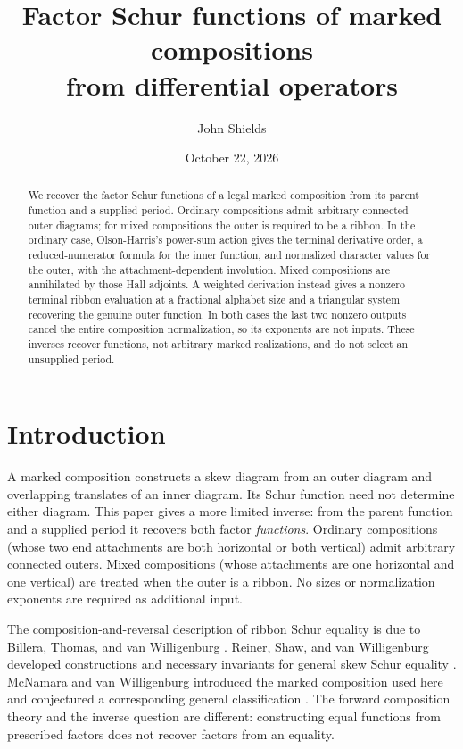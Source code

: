 \documentclass[11pt,a4paper]{amsart}
\title[Factor Schur functions from differential operators]{Factor Schur functions of marked compositions\\ from differential operators}
\author{John Shields}
\date{October 22, 2026}
\numberwithin{equation}{section}
\theoremstyle{plain}
\theoremstyle{definition}
\begin{document}
\begin{abstract}
We recover the factor Schur functions of a legal marked composition from its parent function and a supplied period.  Ordinary compositions admit arbitrary connected outer diagrams; for mixed compositions the outer is required to be a ribbon.  In the ordinary case, Olson-Harris's power-sum action gives the terminal derivative order, a reduced-numerator formula for the inner function, and normalized character values for the outer, with the attachment-dependent involution.  Mixed compositions are annihilated by those Hall adjoints.  A weighted derivation instead gives a nonzero terminal ribbon evaluation at a fractional alphabet size and a triangular system recovering the genuine outer function.  In both cases the last two nonzero outputs cancel the entire composition normalization, so its exponents are not inputs.  These inverses recover functions, not arbitrary marked realizations, and do not select an unsupplied period.
\end{abstract}

\maketitle

\section{Introduction}\label{sec:introduction}

A marked composition constructs a skew diagram from an outer diagram and overlapping translates of an inner diagram.  Its Schur function need not determine either diagram.  This paper gives a more limited inverse: from the parent function and a supplied period it recovers both factor \emph{functions}.  Ordinary compositions (whose two end attachments are both horizontal or both vertical) admit arbitrary connected outers.  Mixed compositions (whose attachments are one horizontal and one vertical) are treated when the outer is a ribbon.  No sizes or normalization exponents are required as additional input.

The composition-and-reversal description of ribbon Schur equality is due to Billera, Thomas, and van Willigenburg \cite{Billera2006DecomposableCompositions}.  Reiner, Shaw, and van Willigenburg developed constructions and necessary invariants for general skew Schur equality \cite{Reiner2007Coincidences}.  McNamara and van Willigenburg introduced the marked composition used here and conjectured a corresponding general classification \cite{McNamara2009Classification}.  The forward composition theory and the inverse question are different: constructing equal functions from prescribed factors does not recover factors from an equality.
\end{document}
